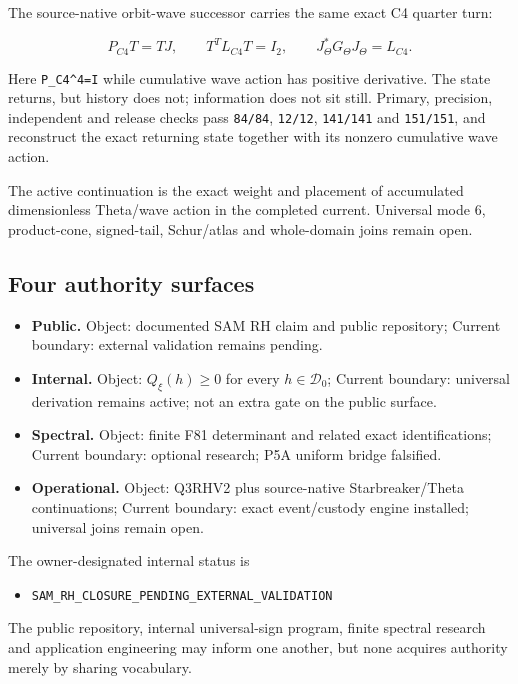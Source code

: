 The source-native orbit-wave successor carries the same exact C4 quarter
turn:

\[
P_{C4}T=TJ,
\qquad
T^TL_{C4}T=I_2,
\qquad
J_\Theta^*G_\Theta J_\Theta=L_{C4}.
\]

Here \texttt{P\_C4\^{}4=I} while cumulative wave action has positive
derivative. The state returns, but history does not; information does
not sit still. Primary, precision, independent and release checks pass
\texttt{84/84}, \texttt{12/12}, \texttt{141/141} and \texttt{151/151},
and reconstruct the exact returning state together with its nonzero cumulative wave action.

The active continuation is the exact weight and placement of accumulated
dimensionless Theta/wave action in the completed current. Universal mode
6, product-cone, signed-tail, Schur/atlas and whole-domain joins remain
open.

\subsection{Four authority surfaces}\label{viii-ch09-four-authority-surfaces}

\begin{itemize}
\tightlist
\item
  \textbf{Public.} Object: documented SAM RH claim and public
  repository; Current boundary: external validation remains pending.
\item
  \textbf{Internal.} Object: \(Q_\xi(h)\ge0\) for every
  \(h\in\mathcal D_0\); Current boundary: universal derivation remains
  active; not an extra gate on the public surface.
\item
  \textbf{Spectral.} Object: finite F81 determinant and related exact
  identifications; Current boundary: optional research; P5A uniform
  bridge falsified.
\item
  \textbf{Operational.} Object: Q3RHV2 plus source-native
  Starbreaker/Theta continuations; Current boundary: exact event/custody
  engine installed; universal joins remain open.
\end{itemize}

The owner-designated internal status is

\begin{itemize}
\tightlist
\item
  \nolinkurl{SAM_RH_CLOSURE_PENDING_EXTERNAL_VALIDATION}
\end{itemize}

The public repository, internal universal-sign program, finite spectral
research and application engineering may inform one another, but none
acquires authority merely by sharing vocabulary.

